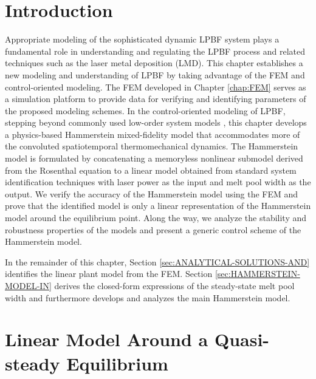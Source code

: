\documentclass [11pt, proquest] {uwthesis}[2020/02/24]
\begin{document}
\section{Introduction}

Appropriate modeling of the sophisticated
dynamic LPBF system plays a fundamental role in understanding and regulating
the LPBF process and related techniques such as the laser metal deposition (LMD). This chapter establishes a new modeling and understanding of LPBF by
taking advantage of the FEM and control-oriented modeling. The FEM developed in Chapter \ref{chap:FEM} serves as a simulation platform to provide data for verifying and identifying
parameters of the proposed modeling schemes. In the control-oriented
modeling of LPBF, stepping beyond commonly used low-order system models  \cite{kruth2007feedback,craeghs2010feedback,zheng2020distributed,song2011feedback,cao2015control,sammons2014repetitive}, this chapter develops a physics-based Hammerstein mixed-fidelity model that accommodates
more of the convoluted spatiotemporal thermomechanical dynamics. The
Hammerstein model is formulated by concatenating a memoryless nonlinear
submodel derived from the Rosenthal equation to a linear model obtained
from standard system identification techniques with laser power as
the input and melt pool width as the output. We verify the accuracy
of the Hammerstein model using the FEM and prove that the identified
model is only a linear representation of the Hammerstein model around
the equilibrium point. Along the way, we analyze the stability and
robustness properties of the models and present a generic control
scheme of the Hammerstein model.

In the remainder of this chapter, Section \ref{sec:ANALYTICAL-SOLUTIONS-AND}
identifies the linear plant model from the FEM. Section \ref{sec:HAMMERSTEIN-MODEL-IN}
derives the closed-form expressions of the steady-state melt pool
width and furthermore develops and analyzes the main Hammerstein model.

\section{\label{sec:ANALYTICAL-SOLUTIONS-AND}Linear Model Around a Quasi-steady Equilibrium}
\end{document}
